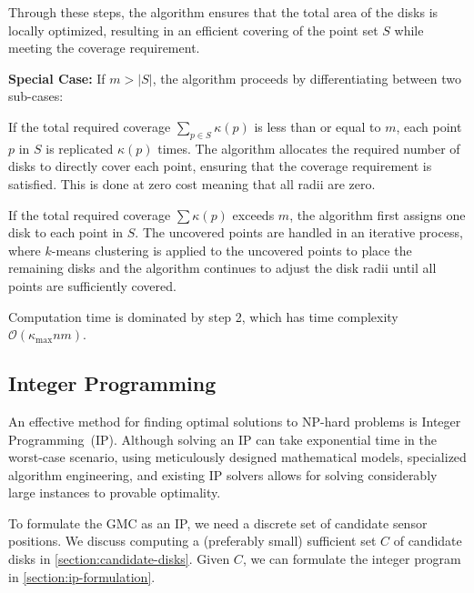 \documentclass[letterpaper, 10 pt, conference]{ieeeconf}
\newcommand{\bigO}{\mathcal{O}} %
\begin{document}
Through these steps, the algorithm ensures that the total area of the disks is locally optimized, resulting in an efficient covering of the point set \( S \) while meeting the coverage requirement.

\textbf{Special Case:} If \( m > |S| \), the algorithm proceeds by differentiating between two sub-cases:
 
If the total required coverage \( \sum_{p \in S} \kappa(p) \) is less than or equal to \( m \), each point $p$ in \( S \) is replicated $\kappa(p)$ times.
The algorithm allocates the required number of disks to directly cover each point, ensuring that the coverage requirement is satisfied.
This is done at zero cost meaning that all radii are zero.

If the total required coverage \( \sum \kappa(p) \) exceeds \( m \), the algorithm first assigns one disk to each point in \( S \).
The uncovered points are handled in an iterative process, where $k$-means clustering is applied to the uncovered points to place the remaining disks and the algorithm continues to adjust the disk radii until all points are sufficiently covered. 


Computation time is dominated by step 2, which has time complexity  $\bigO( \kappa_{\max} n m)$.


\subsection{Integer Programming}\label{sec:IP}

An effective method for finding optimal solutions to NP-hard problems is Integer Programming~(IP).
Although solving an IP can take exponential time in the worst-case scenario, using meticulously designed mathematical models, specialized algorithm engineering, and existing IP solvers allows for solving considerably large instances to provable optimality.

To formulate the GMC as an IP, we need a discrete set of candidate sensor positions.
We discuss computing a (preferably small) sufficient set $C$ of candidate disks in \cref{section:candidate-disks}.
Given $C$, we can formulate the integer program in \cref{section:ip-formulation}.
\end{document}
